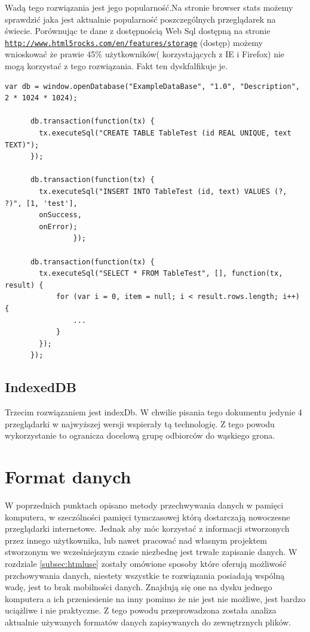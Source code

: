 Wadą tego rozwiązania jest jego popularność.Na stronie browser stats  możemy sprawdzić jaka jest aktualnie popularność poszczególnych przeglądarek na świecie. Porównując te dane z dostępnością Web Sql dostępną na stronie \underline{\texttt{http://www.html5rocks.com/en/features/storage}} (dostęp) możemy wnioskować że prawie 45\% użytkowników( korzystających z IE i Firefox) nie mogą korzystać z tego rozwiązania. Fakt ten dyskfalfikuje je.

\lstset{language=JavaScript}
\label{lis:webSql}
\begin{lstlisting}[caption=json]
      var db = window.openDatabase("ExampleDataBase", "1.0", "Description", 2 * 1024 * 1024);

      db.transaction(function(tx) {
        tx.executeSql("CREATE TABLE TableTest (id REAL UNIQUE, text TEXT)");
      });

      db.transaction(function(tx) {
        tx.executeSql("INSERT INTO TableTest (id, text) VALUES (?, ?)", [1, 'test'],
        onSuccess,
        onError);
                });

      db.transaction(function(tx) {
        tx.executeSql("SELECT * FROM TableTest", [], function(tx, result) {
            for (var i = 0, item = null; i < result.rows.length; i++) {
                ...
			}
        });
      });
\end{lstlisting}

\subsection{IndexedDB}
\label{subsec:indexDB}

Trzecim rozwiązaniem jest indexDb. W chwilie pisania tego dokumentu jedynie 4 przeglądarki w najwyższej wersji wspierały tą technologię. Z tego powodu wykorzystanie to ogranicza docelową grupę odbiorców do wąskiego grona.

\section{Format danych}
\label{sec:dataformat}

W poprzednich punktach opisano metody przechwywania danych w pamięci komputera, w szeczólności pamięci tymczasowej którą dostarczają nowoczesne przeglądarki internetowe. Jednak aby móc korzystać z informacji stworzonych przez innego użytkownika, lub nawet pracować nad własnym projektem stworzonym we wcześniejszym czasie niezbednę jest trwałe zapisanie danych. W rozdziale \ref{subsec:htmluse} zostały omówione sposoby które oferują możliwość przchowywania danych, niestety wszystkie te rozwiązania posiadają wspólną wadę, jest to brak mobilności danych. Znajdują się one na dysku jednego komputera a ich przeniesienie na inny pomimo że nie jest nie możliwe, jest bardzo uciążliwe i nie praktyczne. Z tego powodu przeprowadzona została analiza aktualnie używanych formatów danych zapisywanych do zewnętrznych plików.

